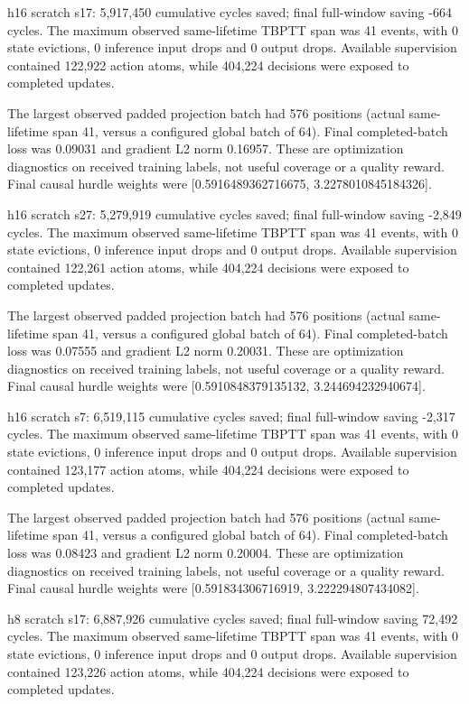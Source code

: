 \documentclass[10pt]{article}
\begin{document}
h16 scratch s17: 5,917,450 cumulative cycles saved; final full-window saving -664 cycles. The maximum observed same-lifetime TBPTT span was 41 events, with 0 state evictions, 0 inference input drops and 0 output drops. Available supervision contained 122,922 action atoms, while 404,224 decisions were exposed to completed updates.

The largest observed padded projection batch had 576 positions (actual same-lifetime span 41, versus a configured global batch of 64). Final completed-batch loss was 0.09031 and gradient L2 norm 0.16957. These are optimization diagnostics on received training labels, not useful coverage or a quality reward. Final causal hurdle weights were [0.5916489362716675, 3.2278010845184326].

h16 scratch s27: 5,279,919 cumulative cycles saved; final full-window saving -2,849 cycles. The maximum observed same-lifetime TBPTT span was 41 events, with 0 state evictions, 0 inference input drops and 0 output drops. Available supervision contained 122,261 action atoms, while 404,224 decisions were exposed to completed updates.

The largest observed padded projection batch had 576 positions (actual same-lifetime span 41, versus a configured global batch of 64). Final completed-batch loss was 0.07555 and gradient L2 norm 0.20031. These are optimization diagnostics on received training labels, not useful coverage or a quality reward. Final causal hurdle weights were [0.5910848379135132, 3.244694232940674].

h16 scratch s7: 6,519,115 cumulative cycles saved; final full-window saving -2,317 cycles. The maximum observed same-lifetime TBPTT span was 41 events, with 0 state evictions, 0 inference input drops and 0 output drops. Available supervision contained 123,177 action atoms, while 404,224 decisions were exposed to completed updates.

The largest observed padded projection batch had 576 positions (actual same-lifetime span 41, versus a configured global batch of 64). Final completed-batch loss was 0.08423 and gradient L2 norm 0.20004. These are optimization diagnostics on received training labels, not useful coverage or a quality reward. Final causal hurdle weights were [0.591834306716919, 3.222294807434082].

h8 scratch s17: 6,887,926 cumulative cycles saved; final full-window saving 72,492 cycles. The maximum observed same-lifetime TBPTT span was 41 events, with 0 state evictions, 0 inference input drops and 0 output drops. Available supervision contained 123,226 action atoms, while 404,224 decisions were exposed to completed updates.
\end{document}

